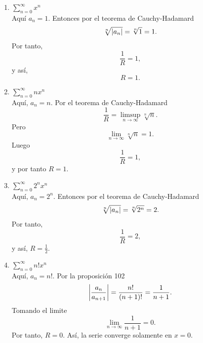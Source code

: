 \documentclass[12pt,a4paper]{article}
\begin{document}
    \begin{solucion}
        \begin{enumerate}
            \item[(a)] $\sum_{n=0}^{\infty}x^{n}$\\
            Aquí $a_{n}=1$. Entonces por el teorema de Cauchy-Hadamard
            \begin{equation*}
                \sqrt[n]{\abs{a_{n}}}=\sqrt[n]{1}=1.
            \end{equation*}
            Por tanto, 
            \begin{equation*}
                \frac{1}{R}=1,
            \end{equation*}
            y así,
            \begin{equation*}
                R=1.
            \end{equation*}
            \item[(b)] $\sum_{n=0}^{\infty}nx^{n}$\\
            Aquí, $a_{n}=n$. Por el teorema de Cauchy-Hadamard
            \begin{equation*}
                \frac{1}{R}=\limsup_{n\to\infty}\sqrt[n]{n}.
            \end{equation*}
            Pero
            \begin{equation*}
                \lim_{n\to\infty}\sqrt[n]{n}=1.
            \end{equation*}
            Luego
            \begin{equation*}
                \frac{1}{R}=1, 
            \end{equation*}
            y por tanto $R=1$.
            \item[(c)] $\sum_{n=0}^{\infty}2^{n}x^{n}$\\
            Aquí, $a_{n}=2^{n}$. Entonces por el teorema de Cauchy-Hadamard
            \begin{equation*}
                \sqrt[n]{\abs{a_{n}}}=\sqrt[n]{2^{n}}=2.
            \end{equation*}
            Por tanto,
            \begin{equation*}
                \frac{1}{R}=2,
            \end{equation*}
            y así, $R=\frac{1}{2}$.
            \item[(d)] $\sum_{n=0}^{\infty}n!x^{n}$\\
            Aquí, $a_{n}=n!$. Por la proposición 102
            \begin{equation*}
                \abs{\frac{a_{n}}{a_{n+1}}}=\frac{n!}{(n+1)!}=\frac{1}{n+1}.
            \end{equation*}
            Tomando el limite
            \begin{equation*}
                \lim_{n\to\infty}\frac{1}{n+1}=0.
            \end{equation*}
            Por tanto, $R=0$. Así, la serie converge solamente en $x=0$.
        \end{enumerate}
    \end{solucion}
    
\end{document}
